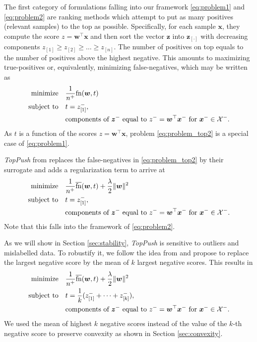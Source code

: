 \documentclass[]{interact}
\theoremstyle{plain}%
\theoremstyle{definition}
\theoremstyle{remark}
\newcommand{\norm}[1]{\|#1\|}
\newcommand{\toppush}{\emph{TopPush}\xspace}
\newcommand{\fn}{\textnormal{fn}}
\newcommand{\fns}{\overline{\textnormal{fn}}}
\newcommand{\Xcal}{\mathcal{X}}
\begin{document}
The first category of formulations falling into our framework \eqref{eq:problem1} and \eqref{eq:problem2} are ranking methods which attempt to put as many positives (relevant samples) to the top as possible. Specifically, for each sample $\bm x$, they compute the score $z=\bm w^\top \bm x$ and then sort the vector $\bm z$ into $\bm z_{[\cdot]}$ with decreasing components $z_{[1]}\ge z_{[2]}\ge\dots\ge z_{[n]}$. The number of positives on top equals to the number of positives above the highest negative. This amounts to maximizing true-positives or, equivalently, minimizing false-negatives, which may be written as
\begin{equation}\label{eq:problem_top2}
\aligned
{\rm minimize} & \quad\frac{1}{n^{+}}\fn(\bm w,t) \\
\textnormal{subject to} & \quad t = z_{[1]}^-, \\
& \quad \text{components of }\bm z^-\text{ equal to }z^-=\bm w^\top \bm x^-\text{ for }\bm x^- \in \Xcal^-.
\endaligned
\end{equation}
As $t$ is a function of the scores $z=\bm w^\top \bm x$, problem \eqref{eq:problem_top2} is a special case of \eqref{eq:problem1}.


\toppush from \citep{Li_TopPush} replaces the false-negatives in \eqref{eq:problem_top2} by their surrogate and adds a regularization term to arrive at
\begin{equation}\label{eq:problem_toppush}
\aligned
{\rm minimize} & \quad\frac{1}{n^{+}}\fns(\bm w,t) + \frac\lambda2\norm{\bm w}^2 \\
\textnormal{subject to} & \quad t = z_{[1]}^-, \\
& \quad \text{components of }\bm z^-\text{ equal to }z^-=\bm w^\top \bm x^-\text{ for }\bm x^- \in \Xcal^-.
\endaligned
\end{equation}
Note that this falls into the framework of \eqref{eq:problem2}.

As we will show in Section \ref{sec:stability}, \toppush is sensitive to outliers and mislabelled data. To robustify it, we follow the idea from \cite{lapin.2015} and propose to replace the largest negative score by the mean of $k$ largest negative scores. This results in
\begin{equation}\label{eq:problem_toppushk}
\aligned
{\rm minimize} & \quad\frac{1}{n^{+}}\fns(\bm w,t) + \frac\lambda2\norm{\bm w}^2 \\
\textnormal{subject to} & \quad t = \frac 1k(z_{[1]}^- + \dots + z_{[k]}^-), \\
& \quad \text{components of }\bm z^-\text{ equal to }z^-=\bm w^\top \bm x^-\text{ for }\bm x^- \in \Xcal^-.
\endaligned
\end{equation}
We used the mean of highest $k$ negative scores instead of the value of the $k$-th negative score to preserve convexity as shown in Section \ref{sec:convexity}.
\end{document}
